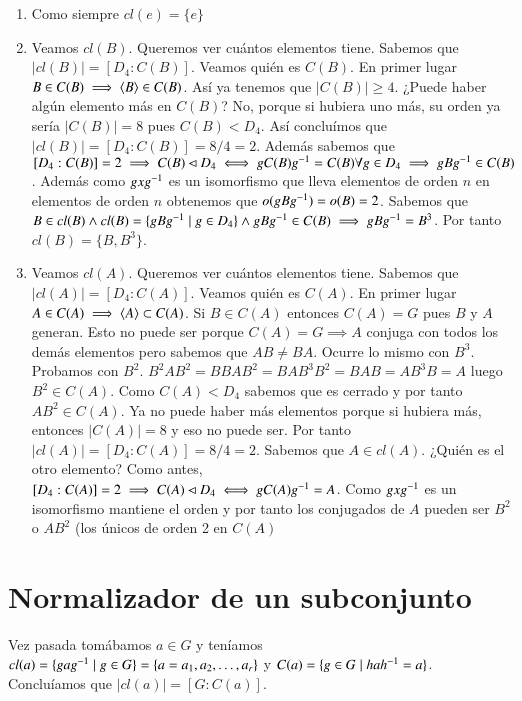 \begin{ej}
	\begin{enumerate}
		\item Como siempre $cl(e) = \{e\}$
		\item Veamos $cl(B)$. Queremos ver cuántos elementos tiene. Sabemos que $|cl(B)| = [D_4:C(B)]$. Veamos quién es $C(B)$. En primer lugar $B \in C(B) \implies \langle B\rangle \in C(B)$. Así ya tenemos que $|C(B)| \geq 4$. ¿Puede haber algún elemento más en $C(B)$? No, porque si hubiera uno más, su orden ya sería $|C(B)| = 8$ pues $C(B) < D_4$. Así concluímos que $|cl(B)| = [D_4:C(B)] = 8 / 4 = 2$. Además sabemos que $[D_4:C(B)] = 2 \implies C(B) \lhd D_4 \iff gC(B)g^{-1} = C(B) \forall g \in D_4 \implies gBg^{-1} \in C(B)$. Además como $gxg^{-1}$ es un isomorfismo que lleva elementos de orden $n$ en elementos de orden $n$ obtenemos que $o(gBg^{-1}) = o(B) = 2$. Sabemos que $B \in cl(B) \land cl(B) = \{gBg^{-1} \mid g \in D_4\} \land gBg^{-1} \in C(B) \implies gBg^{-1} = B^3$. Por tanto $cl(B) = \{B, B^3\}$.
		\item Veamos $cl(A)$. Queremos ver cuántos elementos tiene. Sabemos que $|cl(A)| = [D_4:C(A)]$. Veamos quién es $C(A)$. En primer lugar $A \in C(A) \implies \langle A\rangle \subset C(A)$. Si $B \in C(A)$ entonces $C(A) = G$ pues $B$ y $A$ generan. Esto no puede ser porque $C(A) = G \implies A$ conjuga con todos los demás elementos pero sabemos que $AB \neq BA$. Ocurre lo mismo con $B^3$. Probamos con $B^2$. $B^2AB^2 = BBAB^2 = BAB^3B^2 = BAB = AB^3B = A$ luego $B^2 \in C(A)$. Como $C(A) < D_4$ sabemos que es cerrado y por tanto $AB^2 \in C(A)$. Ya no puede haber más elementos porque si hubiera más, entonces $|C(A)| = 8$ y eso no puede ser. Por tanto $|cl(A)| = [D_4:C(A)] = 8 / 4 = 2$. Sabemos que $A \in cl(A)$. ¿Quién es el otro elemento? Como antes, $[D_4:C(A)] = 2 \implies C(A) \lhd D_4 \iff gC(A)g^{-1} = A$. Como $gxg^{-1}$ es un isomorfismo mantiene el orden y por tanto los conjugados de $A$ pueden ser $B^2$ o $AB^2$ (los únicos de orden 2 en $C(A)$
	\end{enumerate}
\end{ej}

\section{Normalizador de un subconjunto}

Vez pasada tomábamos $a \in G$ y teníamos $cl(a) = \{g a g^{-1} \mid g \in G\} = \{a=a_1, a_2, \dots, a_r\}$ y $C(a) = \{g \in G \mid hah^{-1} = a \}$. Concluíamos que $|cl(a)| = [G:C(a)]$.

